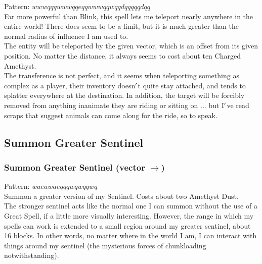 \documentclass[12pt]{article}
\begin{document}
    Pattern: $wwwqqqwwwqqeqqwwwqqwqqdqqqqqdqq$\\
      Far more powerful than Blink, this spell lets me teleport nearly anywhere in the entire world! There does seem to be a limit, but it is much greater than the normal radius of influence I am used to.\\


  
    The entity will be teleported by the given vector, which is an offset from its given position. No matter the distance, it always seems to cost about ten Charged Amethyst.\\The transference is not perfect, and it seems when teleporting something as complex as a player, their inventory doesn$\rq$t quite stay attached, and tends to splatter everywhere at the destination. In addition, the target will be forcibly removed from anything inanimate they are riding or sitting on ... but I$\rq$ve read scraps that suggest animals can come along for the ride, so to speak.\\

\newpage

\label{sec:patterns/great_spells/greater_sentinel}
\subsection*{Summon Greater Sentinel}


  \label{sec: patterns/great_spells/greater_sentinel@hexcasting:sentinel/create/great}
\subsubsection*{Summon Greater Sentinel (vector $\rightarrow$)}

    Pattern: $waeawaeqqqwqwqqwq$\\
      Summon a greater version of my Sentinel. Costs about two Amethyst Dust.\\


  
    The stronger sentinel acts like the normal one I can summon without the use of a Great Spell, if a little more visually interesting. However, the range in which my spells can work is extended to a small region around my greater sentinel, about 16 blocks. In other words, no matter where in the world I am, I can interact with things around my sentinel (the mysterious forces of chunkloading notwithstanding).\\

\newpage
\end{document}
